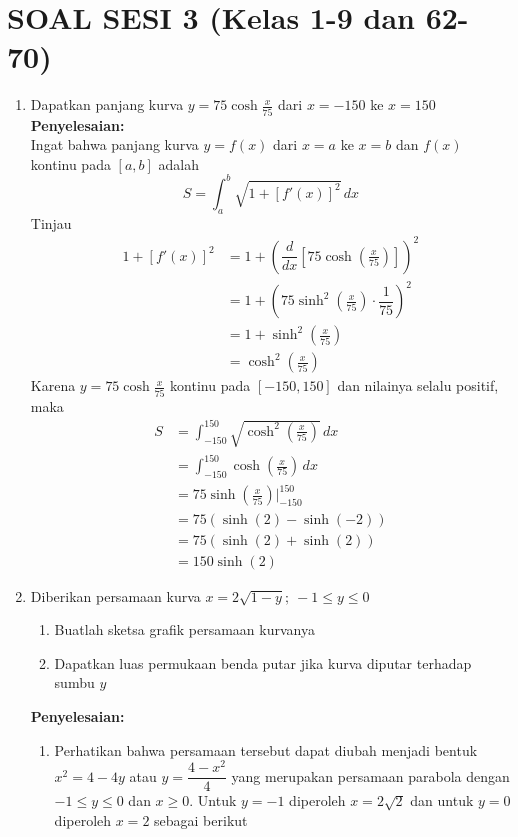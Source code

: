 \documentclass{article}
\begin{document}
\section*{SOAL SESI 3 (Kelas 1-9 dan 62-70)}
\begin{enumerate}
	\item Dapatkan panjang kurva $y=75\cosh \frac{x}{75}$ dari $x=-150$ ke $x=150$\\
	\textbf{Penyelesaian:}\\
	Ingat bahwa panjang kurva $y=f(x)$ dari $x=a$ ke $x=b$ dan $f(x)$ kontinu pada $[a,b]$ adalah 
	$$ S=\int_a^b \sqrt{1+[f'(x)]^2}\, dx $$
	Tinjau 
	\begin{align*}
	1+[f'(x)]^2 &= 1+\left(\dfrac{d}{dx}\left[75\cosh \left(\frac{x}{75}\right)\right]\right)^2\\
	&= 1+\left(75\sinh^2 \left(\frac{x}{75}\right)\cdot \dfrac{1}{75}\right)^2\\
	&= 1+\sinh^2 \left(\frac{x}{75}\right)\\
	&= \cosh^2\left(\frac{x}{75}\right)
	\end{align*}
	Karena $y=75\cosh \frac{x}{75}$ kontinu pada $[-150,150]$ dan nilainya selalu positif, maka 
	\begin{align*}
	S &= \int_{-150}^{150} \sqrt{\cosh^2\left(\frac{x}{75}\right)} \, dx\\
	&= \int_{-150}^{150} \cosh \left(\frac{x}{75}\right) \, dx\\
	&= 75\sinh\left(\frac{x}{75}\right)\Big|^{150}_{-150}\\
	&= 75(\sinh(2)-\sinh(-2))\\
	&= 75(\sinh(2)+\sinh(2))\\
	&= 150\sinh(2)
	\end{align*}
	\item Diberikan persamaan kurva $x=2\sqrt{1-y};~-1\leq y\leq 0$
	\begin{enumerate}
		\item Buatlah sketsa grafik persamaan kurvanya
		\item Dapatkan luas permukaan benda putar jika kurva diputar terhadap sumbu $y$
	\end{enumerate}
	\textbf{Penyelesaian:}
	\begin{enumerate}
		\item Perhatikan bahwa persamaan tersebut dapat diubah menjadi bentuk $x^2=4-4y$ atau $y=\dfrac{4-x^2}{4}$ yang merupakan persamaan parabola dengan $-1\leq y\leq 0$ dan $x\geq 0$. Untuk $y=-1$ diperoleh $x=2\sqrt{2}$ dan untuk $y=0$ diperoleh $x=2$ sebagai berikut

\end{enumerate}
\end{enumerate}
\end{document}
